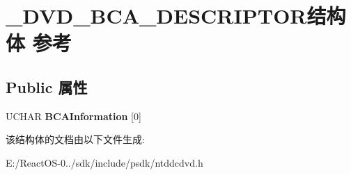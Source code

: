 \hypertarget{struct___d_v_d___b_c_a___d_e_s_c_r_i_p_t_o_r}{}\section{\+\_\+\+D\+V\+D\+\_\+\+B\+C\+A\+\_\+\+D\+E\+S\+C\+R\+I\+P\+T\+O\+R结构体 参考}
\label{struct___d_v_d___b_c_a___d_e_s_c_r_i_p_t_o_r}
\subsection*{Public 属性}
\begin{DoxyCompactItemize}
\item 
\mbox{\label{struct___d_v_d___b_c_a___d_e_s_c_r_i_p_t_o_r_ac150b80d0ea482738c2c1fbf83b43330}} 
U\+C\+H\+AR {\bfseries B\+C\+A\+Information} \mbox{[}0\mbox{]}
\end{DoxyCompactItemize}


该结构体的文档由以下文件生成\+:\begin{DoxyCompactItemize}
\item 
E\+:/\+React\+O\+S-\/0../sdk/include/psdk/ntddcdvd.\+h\end{DoxyCompactItemize}
